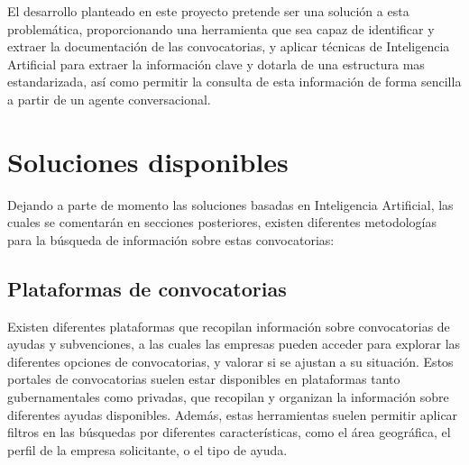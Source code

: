 El desarrollo planteado en este proyecto pretende ser una solución a esta problemática, proporcionando una herramienta que sea capaz de identificar y extraer la documentación de las convocatorias, y aplicar técnicas de Inteligencia Artificial para extraer la información clave y dotarla de una estructura mas estandarizada, así como permitir la consulta de esta información de forma sencilla a partir de un agente conversacional.


\section{Soluciones disponibles}

Dejando a parte de momento las soluciones basadas en Inteligencia Artificial, las cuales se comentarán en secciones posteriores, existen diferentes metodologías para la búsqueda de información sobre estas convocatorias:

\subsection{Plataformas de convocatorias}

Existen diferentes plataformas que recopilan información sobre convocatorias de ayudas y subvenciones, a las cuales las empresas pueden acceder para explorar las diferentes opciones de convocatorias, y valorar si se ajustan a su situación.
Estos portales de convocatorias suelen estar disponibles en plataformas tanto gubernamentales como privadas, que recopilan y organizan la información sobre diferentes ayudas disponibles. 
Además, estas herramientas suelen permitir aplicar filtros en las búsquedas por diferentes características, como el área geográfica, el perfil de la empresa solicitante, o el tipo de ayuda.

